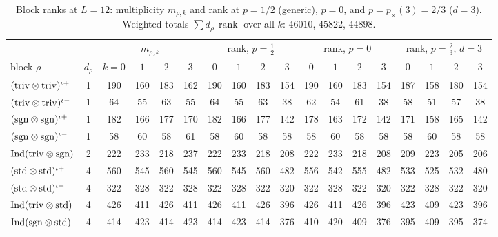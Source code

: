 \documentclass[aps,prx,reprint,superscriptaddress,nobibnotes,longbibliography]{revtex4-2}
\newcommand{\rk}{\operatorname{rank}}
\begin{document}
\begin{table}[t]
\caption{Block ranks at $L=12$: multiplicity $m_{\rho,k}$ and rank at $p=1/2$ (generic), $p=0$, and $p=p_\times(3)=2/3$ ($d=3$).  Weighted totals $\sum d_\rho\,\rk$ over all $k$: $46010$, $45822$, $44898$.}
\label{tab:S5}
\begin{ruledtabular}
\begin{tabular}{lccccccccccccccccc}
 & & \multicolumn{4}{c}{$m_{\rho,k}$} & \multicolumn{4}{c}{rank, $p=\tfrac12$} & \multicolumn{4}{c}{rank, $p=0$} & \multicolumn{4}{c}{rank, $p=\tfrac23$, $d=3$}\\
block $\rho$ & $d_\rho$ & $k{=}0$ & $1$ & $2$ & $3$ & $0$ & $1$ & $2$ & $3$ & $0$ & $1$ & $2$ & $3$ & $0$ & $1$ & $2$ & $3$\\
\colrule
$({\rm triv}\otimes{\rm triv})^{\iota+}$ & 1 & 190 & 160 & 183 & 162 & 190 & 160 & 183 & 154 & 190 & 160 & 183 & 154 & 187 & 158 & 180 & 154\\
$({\rm triv}\otimes{\rm triv})^{\iota-}$ & 1 & 64 & 55 & 63 & 55 & 64 & 55 & 63 & 38 & 62 & 54 & 61 & 38 & 58 & 51 & 57 & 38\\
$({\rm sgn}\otimes{\rm sgn})^{\iota+}$ & 1 & 182 & 166 & 177 & 170 & 182 & 166 & 177 & 142 & 178 & 163 & 172 & 142 & 171 & 158 & 165 & 142\\
$({\rm sgn}\otimes{\rm sgn})^{\iota-}$ & 1 & 58 & 60 & 58 & 61 & 58 & 60 & 58 & 58 & 58 & 60 & 58 & 58 & 58 & 60 & 58 & 58\\
${\rm Ind}({\rm triv}\otimes{\rm sgn})$ & 2 & 222 & 233 & 218 & 237 & 222 & 233 & 218 & 208 & 222 & 233 & 218 & 208 & 209 & 223 & 205 & 206\\
$({\rm std}\otimes{\rm std})^{\iota+}$ & 4 & 560 & 545 & 560 & 545 & 560 & 545 & 560 & 482 & 556 & 542 & 555 & 482 & 533 & 525 & 532 & 480\\
$({\rm std}\otimes{\rm std})^{\iota-}$ & 4 & 322 & 328 & 322 & 328 & 322 & 328 & 322 & 320 & 322 & 328 & 322 & 320 & 322 & 328 & 322 & 320\\
${\rm Ind}({\rm triv}\otimes{\rm std})$ & 4 & 426 & 411 & 426 & 411 & 426 & 411 & 426 & 396 & 426 & 411 & 426 & 396 & 423 & 409 & 423 & 396\\
${\rm Ind}({\rm sgn}\otimes{\rm std})$ & 4 & 414 & 423 & 414 & 423 & 414 & 423 & 414 & 376 & 410 & 420 & 409 & 376 & 395 & 409 & 395 & 374\\
\end{tabular}
\end{ruledtabular}
\end{table}
\end{document}
